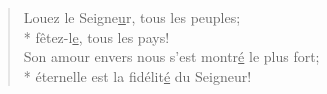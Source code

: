 \begin{verse}
Louez le Seigne\underline{u}r, tous les peuples; \\*
fêtez-l\underline{e}, tous les pays! \\

Son amour envers nous s’est montr\underline{é} le plus fort; \\*
éternelle est la fidélit\underline{é} du Seigneur! \\
\end{verse}

